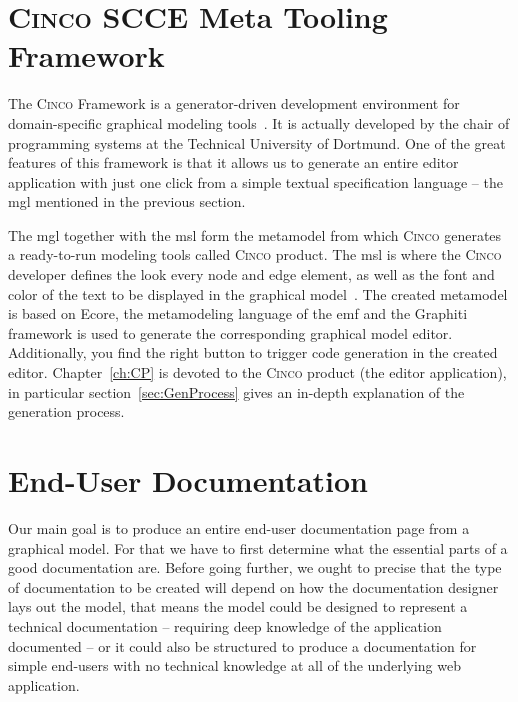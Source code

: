 \section{\textsc{Cinco SCCE} Meta Tooling Framework}\label{sec:cincoTool}

The \textsc{Cinco} Framework is a generator-driven development environment for domain-specific graphical modeling tools~\cite{Cinco}. It is actually developed by the chair of programming systems at the Technical University of Dortmund. One of the great features of this framework is that it allows us to generate an entire editor application with just one click from a simple textual specification language -- the \acrfull{mgl} mentioned in the previous section. 

The \acrshort{mgl} together with the \acrshort{msl} form the metamodel from which \textsc{Cinco} generates a ready-to-run modeling tools called \textsc{Cinco} product. The \acrshort{msl} is where the \textsc{Cinco} developer defines the look every node and edge element, as well as the font and color of the text to be displayed in the graphical model~\cite{naujokat-diss}. The created metamodel is based on Ecore, the metamodeling language of the \acrfull{emf} and the Graphiti framework is used to generate the corresponding graphical model editor. Additionally, you find the right button to trigger code generation in the created editor. Chapter~\ref{ch:CP} is devoted to the \textsc{Cinco} product (the editor application), in particular section~\ref{sec:GenProcess} gives an in-depth explanation of the generation process.



\section{End-User Documentation}\label{sec:endUserDoc}

Our main goal is to produce an entire end-user documentation page from a graphical model. For that we have to first determine what the essential parts of a good documentation are. Before going further, we ought to precise that the type of documentation to be created will depend on how the documentation designer lays out the model, that means the model could be designed to represent a technical documentation -- requiring deep knowledge of the application documented -- or it could also be structured to produce a documentation for simple end-users with no technical knowledge at all of the underlying web application.


